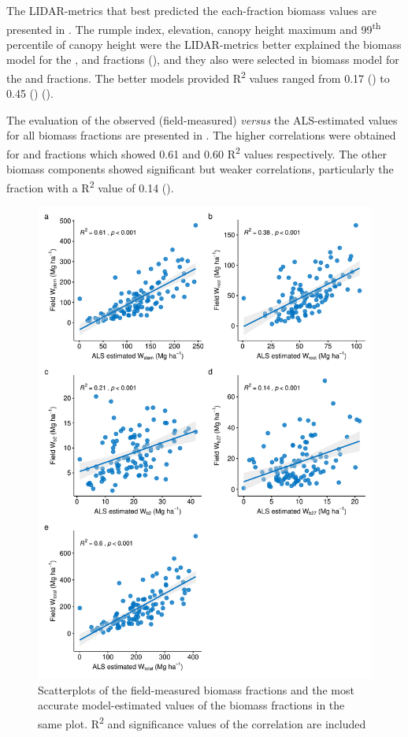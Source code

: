 The LIDAR-metrics that best predicted the each-fraction biomass values are presented in . The rumple index, elevation, canopy height maximum and 99\textsuperscript{th} percentile of canopy height were the LIDAR-metrics better explained the biomass model for the \ws, \wbs and \wt fractions (), and they also were selected in biomass model for the \wro and \wb fractions. The better models provided R\textsuperscript{2} values ranged from 0.17 (\wb) to 0.45 (\ws) ().

The evaluation of the observed (field-measured) \emph{versus} the ALS-estimated values for all biomass fractions are presented in . The higher correlations were obtained for \ws and \wt fractions which showed 0.61 and 0.60 R\textsuperscript{2} values respectively. The other biomass components showed significant but weaker correlations, particularly the \wbs fraction with a R\textsuperscript{2} value of 0.14 ().

\begin{figure}
    \centering
    \includegraphics[height=.6\textheight]{img/carbon/carbon-compara-lidar-field.pdf}\caption{Scatterplots of the field-measured biomass fractions and the most accurate model-estimated values of the biomass fractions in the same plot. R\textsuperscript{2} and significance values of the correlation are included}\label{fig:carbon:compara}
\end{figure}

